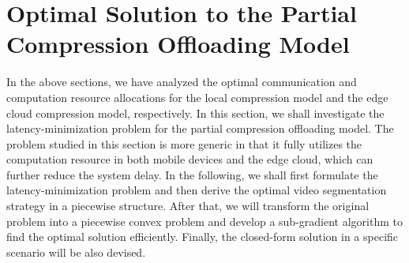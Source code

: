\documentclass[journal,draftcls,onecolumn,12pt,twoside]{IEEEtran}
\begin{document}
\section{Optimal Solution to the Partial Compression Offloading Model}
In the above sections, we have analyzed the optimal communication and computation resource allocations for the local compression model and the edge cloud compression model, respectively. In this section, we shall investigate the latency-minimization problem for the partial compression offloading model. The problem studied in this section is more generic in that it fully utilizes the computation resource in both mobile devices and the edge cloud, which can further reduce the system delay. In the following, we shall first formulate the latency-minimization problem and then derive the optimal video segmentation strategy in a piecewise structure. After that, we will transform the original problem into a piecewise convex problem and develop a sub-gradient algorithm to find the optimal solution efficiently. Finally, the closed-form solution in a specific scenario will be also devised.
\end{document}
